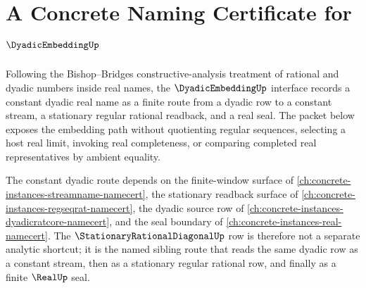 \chapter{A Concrete Naming Certificate for $\DyadicEmbeddingUp$}
\label{ch:concrete-instances-dyadicembedding-namecert}

Following the Bishop--Bridges constructive-analysis treatment of rational and dyadic numbers inside real names, the $\DyadicEmbeddingUp$ interface records a constant dyadic real name as a finite route from a dyadic row to a constant stream, a stationary regular rational readback, and a real seal. The packet below exposes the embedding path without quotienting regular sequences, selecting a host real limit, invoking real completeness, or comparing completed real representatives by ambient equality.

The constant dyadic route depends on the finite-window surface of \autoref{ch:concrete-instances-streamname-namecert}, the stationary readback surface of \autoref{ch:concrete-instances-regseqrat-namecert}, the dyadic source row of \autoref{ch:concrete-instances-dyadicratcore-namecert}, and the seal boundary of \autoref{ch:concrete-instances-real-namecert}. The $\StationaryRationalDiagonalUp$ row is therefore not a separate analytic shortcut; it is the named sibling route that reads the same dyadic row as a constant stream, then as a stationary regular rational row, and finally as a finite $\RealUp$ seal.

